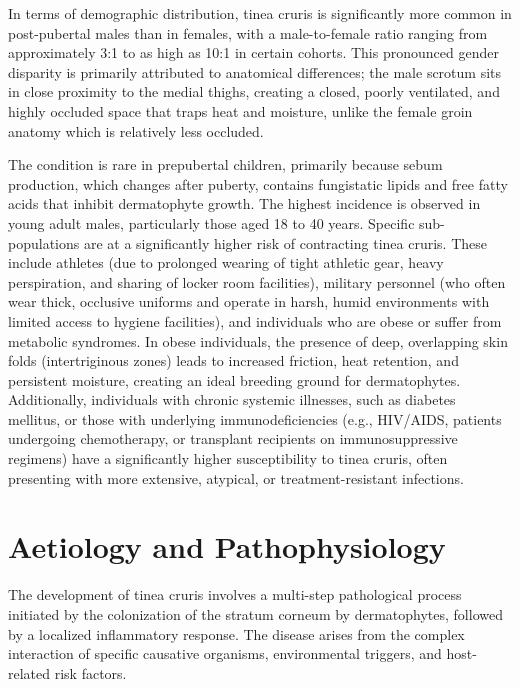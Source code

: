In terms of demographic distribution, tinea cruris is significantly more common in post-pubertal males than in females, with a male-to-female ratio ranging from approximately 3:1 to as high as 10:1 in certain cohorts. This pronounced gender disparity is primarily attributed to anatomical differences; the male scrotum sits in close proximity to the medial thighs, creating a closed, poorly ventilated, and highly occluded space that traps heat and moisture, unlike the female groin anatomy which is relatively less occluded.

The condition is rare in prepubertal children, primarily because sebum production, which changes after puberty, contains fungistatic lipids and free fatty acids that inhibit dermatophyte growth. The highest incidence is observed in young adult males, particularly those aged 18 to 40 years. Specific sub-populations are at a significantly higher risk of contracting tinea cruris. These include athletes (due to prolonged wearing of tight athletic gear, heavy perspiration, and sharing of locker room facilities), military personnel (who often wear thick, occlusive uniforms and operate in harsh, humid environments with limited access to hygiene facilities), and individuals who are obese or suffer from metabolic syndromes. In obese individuals, the presence of deep, overlapping skin folds (intertriginous zones) leads to increased friction, heat retention, and persistent moisture, creating an ideal breeding ground for dermatophytes. Additionally, individuals with chronic systemic illnesses, such as diabetes mellitus, or those with underlying immunodeficiencies (e.g., HIV/AIDS, patients undergoing chemotherapy, or transplant recipients on immunosuppressive regimens) have a significantly higher susceptibility to tinea cruris, often presenting with more extensive, atypical, or treatment-resistant infections.

\section*{Aetiology and Pathophysiology}
The development of tinea cruris involves a multi-step pathological process initiated by the colonization of the stratum corneum by dermatophytes, followed by a localized inflammatory response. The disease arises from the complex interaction of specific causative organisms, environmental triggers, and host-related risk factors.

